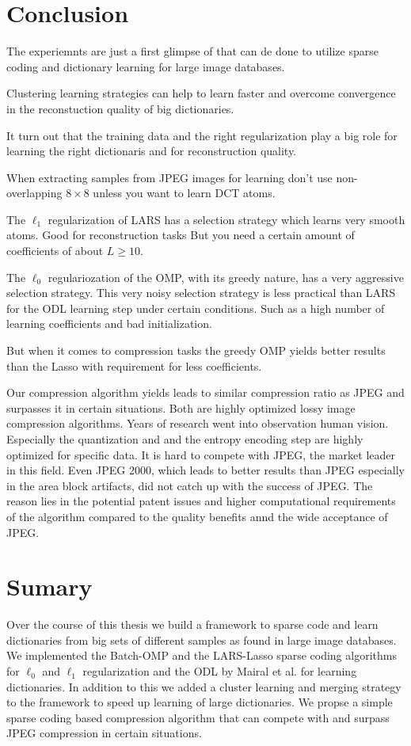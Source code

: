 \section{Conclusion}
The experiemnts are just a first glimpse of that can de done to utilize sparse
coding and dictionary learning for large image databases.

Clustering learning strategies can help to learn faster and overcome
convergence in the reconstuction quality of big dictionaries.


It turn out that the training data and the right 
regularization play a big role for learning the right dictionaris and
for reconstruction quality.

When extracting samples from JPEG images for learning don't use
non-overlapping $8 \times 8$ unless you want to learn DCT atoms. 

The $\ell_1$ regularization of LARS has a selection strategy
which learns very smooth atoms. Good for reconstruction tasks 
But you need a certain amount of coefficients of about $L \ge 10$.

The $\ell_0$ regulariozation of the OMP, with its greedy nature, has a very
aggressive selection strategy. 
This very noisy selection strategy is less practical
than LARS for the ODL learning step under certain conditions. Such as a high
number of learning coefficients and bad initialization.

But when it comes to compression tasks the greedy OMP yields better results
than the Lasso with requirement for less coefficients. 

Our compression algorithm yields leads to similar compression ratio as JPEG
and surpasses it in certain situations.
Both are highly optimized lossy image compression algorithms. 
Years of research went into observation human vision.  Especially the
quantization and and the entropy encoding step are highly optimized for specific
data. It is hard to compete with JPEG, the market leader in this field.  Even
JPEG 2000, which leads to better results than JPEG especially in the area block
artifacts, did not catch up with the success of JPEG. 
The reason lies in the potential patent issues and higher computational
requirements of the algorithm compared to the quality benefits annd the wide
acceptance of JPEG.



\section{Sumary}
Over the course of this thesis we build a framework to sparse code and learn
dictionaries from big sets of different samples as found in large image
databases. We implemented the Batch-OMP and the LARS-Lasso sparse coding
algorithms for $\ell_0$ and $\ell_1$ regularization and the ODL by Mairal et
al. for learning dictionaries. 
In addition to this we added a cluster learning and merging strategy to the
framework to speed up learning of large dictionaries.
We propse a simple sparse coding based compression algorithm that can compete
with and surpass JPEG compression in certain situations.


